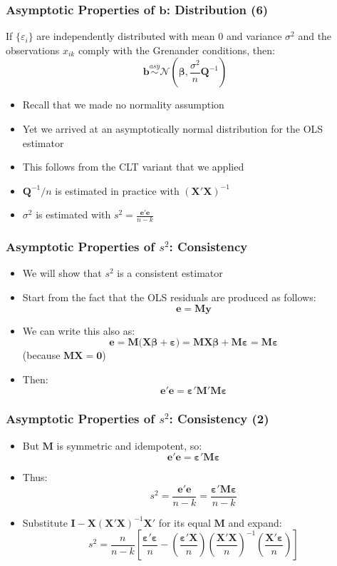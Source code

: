 \documentclass[10pt]{beamer}
\theoremstyle{definition}
\begin{document}
\begin{frame}[fragile]
\frametitle{Asymptotic Properties of $\mathbf{b}$: Distribution (6)}
\begin{theorem}
	If $\{\varepsilon_{i}\}$ are independently distributed with mean 0 and variance $\sigma^{2}$ and the observations $x_{ik}$ comply with the Grenander conditions, then:
	\[
		\mathbf{b} \overset{asy}{\sim} \mathcal{N}\left(\bm\beta,\frac{\sigma^{2}}{n}\mathbf{Q}^{-1}\right)
	\]
\end{theorem}
\begin{itemize}
	\item Recall that we made no normality assumption
	\item Yet we arrived at an asymptotically normal distribution for the OLS estimator
	\item This follows from the CLT variant that we applied 
	\item $\mathbf{Q}^{-1}/n$ is estimated in practice with $(\mathbf{X'X})^{-1}$
	\item $\sigma^{2}$ is estimated with $\displaystyle s^{2} = \frac{\mathbf{e'e}}{n-k}$
\end{itemize}
\end{frame}

\begin{frame}[fragile]
\frametitle{Asymptotic Properties of $s^{2}$: Consistency}
\begin{itemize}
	\item We will show that $s^{2}$ is a consistent estimator
	\item Start from the fact that the OLS residuals are produced as follows:
	\[
		\mathbf{e = My}
	\]
	\item We can write this also as:
	\[
		\mathbf{e = M(X}\bm\beta + \bm\varepsilon) = \mathbf{MX}\bm\beta + \mathbf{M}\bm\varepsilon = \mathbf{M}\bm\varepsilon
	\]
	(because $\mathbf{MX = 0}$)
	\item Then:
	\[
		\mathbf{e'e} = \bm\varepsilon'\mathbf{\mathbf{M'M}}\bm\varepsilon
	\]
\end{itemize}
\end{frame}

\begin{frame}[fragile]
\frametitle{Asymptotic Properties of $s^{2}$: Consistency (2)}
\begin{itemize}
	\item But $\mathbf{M}$ is symmetric and idempotent, so:
	\[
		\mathbf{e'e} = \bm\varepsilon'\mathbf{\mathbf{M}}\bm\varepsilon
	\]
	\item Thus:
	\[
		\displaystyle s^{2} = \frac{\mathbf{e'e}}{n-k} = \frac{\bm\varepsilon'\mathbf{\mathbf{M}}\bm\varepsilon}{n-k}
	\]
	\item Substitute $\mathbf{I - X(X'X)}^{-1}\mathbf{X}'$ for its equal $\mathbf{M}$ and expand:
	\[
		s^{2} = \frac{n}{n-k}\left[ \frac{\bm\varepsilon'\bm\varepsilon}{n} - \left(\frac{\bm\varepsilon'\mathbf{X}}{n}\right) \left(\frac{\mathbf{X'X}}{n}\right)^{-1} \left(\frac{\mathbf{X'}\bm\varepsilon}{n}\right) \right]
	\]
\end{itemize}
\end{frame}
\end{document}
